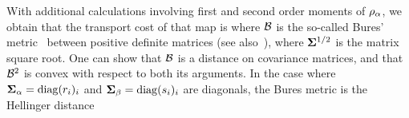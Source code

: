 With additional calculations involving first and second order moments of $\rho_\alpha$, we obtain that the transport cost of that map is
where $\mathcal{B}$ is the so-called Bures' metric~\cite{bures1969extension} between positive definite matrices (see also~\cite{forrester2016relating}),
where $\mathbf{\Sigma}^{1/2}$ is the matrix square root. One can show that $\mathcal{B}$ is a distance on covariance matrices, and that $\mathcal{B}^2$ is convex with respect to both its arguments. 
%
In the case where $\mathbf{\Sigma}_\alpha = \operatorname{diag}(r_i)_i$ and $\mathbf{\Sigma}_\beta = \operatorname{diag}(s_i)_i$ are diagonals, the Bures metric is the Hellinger distance
%

